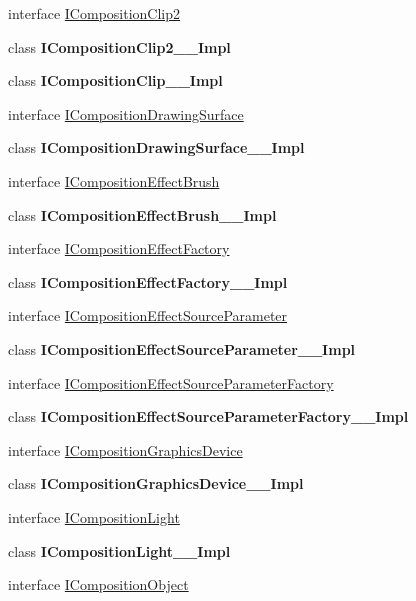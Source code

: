 \begin{DoxyCompactItemize}
\item 
interface \hyperlink{interface_windows_1_1_u_i_1_1_composition_1_1_i_composition_clip2}{I\+Composition\+Clip2}
\item 
class {\bfseries I\+Composition\+Clip2\+\_\+\+\_\+\+Impl}
\item 
class {\bfseries I\+Composition\+Clip\+\_\+\+\_\+\+Impl}
\item 
interface \hyperlink{interface_windows_1_1_u_i_1_1_composition_1_1_i_composition_drawing_surface}{I\+Composition\+Drawing\+Surface}
\item 
class {\bfseries I\+Composition\+Drawing\+Surface\+\_\+\+\_\+\+Impl}
\item 
interface \hyperlink{interface_windows_1_1_u_i_1_1_composition_1_1_i_composition_effect_brush}{I\+Composition\+Effect\+Brush}
\item 
class {\bfseries I\+Composition\+Effect\+Brush\+\_\+\+\_\+\+Impl}
\item 
interface \hyperlink{interface_windows_1_1_u_i_1_1_composition_1_1_i_composition_effect_factory}{I\+Composition\+Effect\+Factory}
\item 
class {\bfseries I\+Composition\+Effect\+Factory\+\_\+\+\_\+\+Impl}
\item 
interface \hyperlink{interface_windows_1_1_u_i_1_1_composition_1_1_i_composition_effect_source_parameter}{I\+Composition\+Effect\+Source\+Parameter}
\item 
class {\bfseries I\+Composition\+Effect\+Source\+Parameter\+\_\+\+\_\+\+Impl}
\item 
interface \hyperlink{interface_windows_1_1_u_i_1_1_composition_1_1_i_composition_effect_source_parameter_factory}{I\+Composition\+Effect\+Source\+Parameter\+Factory}
\item 
class {\bfseries I\+Composition\+Effect\+Source\+Parameter\+Factory\+\_\+\+\_\+\+Impl}
\item 
interface \hyperlink{interface_windows_1_1_u_i_1_1_composition_1_1_i_composition_graphics_device}{I\+Composition\+Graphics\+Device}
\item 
class {\bfseries I\+Composition\+Graphics\+Device\+\_\+\+\_\+\+Impl}
\item 
interface \hyperlink{interface_windows_1_1_u_i_1_1_composition_1_1_i_composition_light}{I\+Composition\+Light}
\item 
class {\bfseries I\+Composition\+Light\+\_\+\+\_\+\+Impl}
\item 
interface \hyperlink{interface_windows_1_1_u_i_1_1_composition_1_1_i_composition_object}{I\+Composition\+Object}

\end{DoxyCompactItemize}
